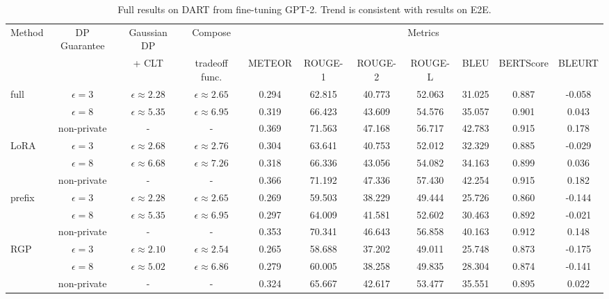 






\setlength{\tabcolsep}{2pt}%
\renewcommand{\arraystretch}{0.75}%
\begin{table}[h]
\footnotesize
\caption{
Full results on DART from fine-tuning GPT-2. Trend is consistent with results on E2E.
}
\centering
\begin{tabular}{l c c c ccccccc}
\toprule
\multirow{2}[0]{*}{Method} & \multirow{2}[0]{*}{DP Guarantee} & Gaussian DP & Compose & \multicolumn{7}{c}{Metrics}  \\
 & & + CLT & tradeoff func. & \tiny{METEOR} & \tiny{ROUGE-1} & \tiny{ROUGE-2} & \tiny{ROUGE-L} & \tiny{BLEU} & \tiny{BERTScore} & \tiny{BLEURT} \\

\midrule
\multirow{3}[1]{*}{full}
 & $\epsilon=3$  & $\epsilon \approx 2.28$  & $\epsilon \approx 2.65$  & 0.294 & 62.815 & 40.773  & 52.063  & 31.025 & 0.887  & -0.058\\
 & $\epsilon=8$  & $\epsilon \approx 5.35$  & $\epsilon \approx 6.95$  & 0.319  & 66.423  & 43.609  & 54.576  & 35.057  & 0.901  & 0.043 \\
 & non-private  & -  & -  & 0.369 & 71.563 & 47.168 & 56.717 & 42.783 & 0.915 & 0.178\\

\midrule
\multirow{3}[1]{*}{LoRA}
 & $\epsilon=3$  & $\epsilon \approx 2.68$  & $\epsilon \approx 2.76$  & 0.304  & 63.641  & 40.753 & 52.012 & 32.329  & 0.885 & -0.029 \\
 & $\epsilon=8$  & $\epsilon \approx 6.68$  & $\epsilon \approx 7.26$  & 0.318 & 66.336 & 43.056 & 54.082 & 34.163 & 0.899 & 0.036\\
 & non-private  & -  & -  & 0.366 & 71.192 & 47.336 & 57.430 & 42.254 & 0.915 & 0.182\\

\midrule
\multirow{3}[1]{*}{prefix}
 & $\epsilon=3$  & $\epsilon \approx 2.28$  & $\epsilon \approx 2.65$  & 0.269 & 59.503 & 38.229 & 49.444 & 25.726 & 0.860 & -0.144\\
 & $\epsilon=8$  & $\epsilon \approx 5.35$  & $\epsilon \approx 6.95$  & 0.297 & 64.009 & 41.581 & 52.602 & 30.463 & 0.892 & -0.021\\
 & non-private  & -  & -  & 0.353 & 70.341 & 46.643 & 56.858 & 40.163 & 0.912 & 0.148\\

\midrule
\multirow{3}[1]{*}{RGP}
 & $\epsilon=3$  & $\epsilon \approx 2.10$  & $\epsilon \approx 2.54$  & 0.265 & 58.688 & 37.202 & 49.011 & 25.748 & 0.873 & -0.175\\
 & $\epsilon=8$  & $\epsilon \approx 5.02$  & $\epsilon \approx 6.86$  & 0.279 & 60.005 & 38.258 & 49.835 & 28.304 & 0.874 & -0.141\\
 & non-private  & -  & -  & 0.324 & 65.667 & 42.617 & 53.477 & 35.551 & 0.895 & 0.022\\


\end{tabular}
\end{table}
